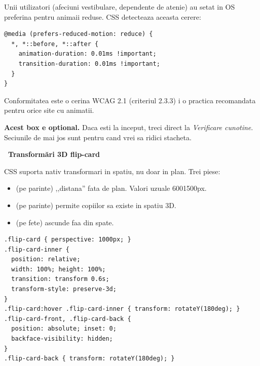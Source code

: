 Unii utilizatori (afeciuni vestibulare, dependente de atenie) au setat in OS preferina pentru animaii reduse. CSS detecteaza aceasta cerere:

\begin{lstlisting}[style=css]
@media (prefers-reduced-motion: reduce) {
  *, *::before, *::after {
    animation-duration: 0.01ms !important;
    transition-duration: 0.01ms !important;
  }
}
\end{lstlisting}

Conformitatea este o cerina WCAG 2.1 (criteriul 2.3.3) i o practica recomandata pentru orice site cu animatii.

\begin{bonusbox}
\textbf{Acest box e optional.} Daca esti la inceput, treci direct la \emph{Verificare cunotine}. Seciunile de mai jos sunt pentru cand vrei sa ridici stacheta.

\medskip

\textbf{\faCube\ Transform\u ari 3D \textendash{} flip-card}

CSS suporta nativ transformari in spatiu, nu doar in plan. Trei piese:

\begin{itemize}[itemsep=1pt]
  \item {} (pe parinte) \textendash{} ,,distana'' fata de plan. Valori uzuale 600\textendash{}1500px.
  \item {} (pe parinte) \textendash{} permite copiilor sa existe in spatiu 3D.
  \item {} (pe fete) \textendash{} ascunde faa din spate.
\end{itemize}

\begin{lstlisting}[style=css, caption={Card care se intoarce la hover (flip-card)}]
.flip-card { perspective: 1000px; }
.flip-card-inner {
  position: relative;
  width: 100%; height: 100%;
  transition: transform 0.6s;
  transform-style: preserve-3d;
}
.flip-card:hover .flip-card-inner { transform: rotateY(180deg); }
.flip-card-front, .flip-card-back {
  position: absolute; inset: 0;
  backface-visibility: hidden;
}
.flip-card-back { transform: rotateY(180deg); }
\end{lstlisting}


\end{bonusbox}
